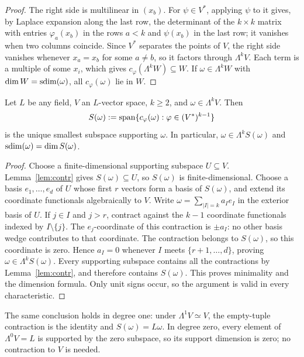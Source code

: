 \begin{proof}
The right side is multilinear in $(x_b)$. For $\psi\in V^*$, applying $\psi$ to it gives, by Laplace expansion along the
last row, the determinant of the $k\times k$ matrix with entries $\varphi_a(x_b)$ in the rows $a<k$ and $\psi(x_b)$ in the last
row; it vanishes when two columns coincide. Since $V^*$ separates the points of $V$, the right side
vanishes whenever $x_a=x_b$ for some $a\ne b$, so it factors through $\Lambda^kV$. Each term is a multiple of some $x_i$, which gives
$c_\varphi(\Lambda^kW)\subseteq W$. If $\omega\in\Lambda^kW$ with $\dim W=\operatorname{sdim}(\omega)$, all $c_\varphi(\omega)$ lie in $W$.
\end{proof}

\begin{proposition}\label{prop:canonical-support}
Let $L$ be any field, $V$ an $L$\nobreakdash-vector space, $k\ge2$, and
$\omega\in\Lambda^kV$. Then
\[
S(\omega):=\operatorname{span}\{c_\varphi(\omega):\varphi\in(V^*)^{k-1}\}
\]
is the unique smallest subspace supporting $\omega$. In particular,
$\omega\in\Lambda^k S(\omega)$ and
$\operatorname{sdim}(\omega)=\dim S(\omega)$.
\end{proposition}

\begin{proof}
Choose a finite-dimensional supporting subspace $U\subseteq V$.
Lemma~\ref{lem:contr} gives $S(\omega)\subseteq U$, so $S(\omega)$ is
finite-dimensional. Choose a basis $e_1,\dots,e_d$ of $U$ whose first
$r$ vectors form a basis of $S(\omega)$, and extend its coordinate
functionals algebraically to $V$. Write
$\omega=\sum_{|I|=k}a_Ie_I$ in the exterior basis of $U$.
If $j\in I$ and $j>r$, contract against the $k-1$ coordinate functionals
indexed by $I\setminus\{j\}$. The $e_j$\nobreakdash-coordinate of this
contraction is $\pm a_I$: no other basis wedge contributes to that
coordinate. The contraction belongs to $S(\omega)$, so this coordinate
is zero. Hence $a_I=0$ whenever $I$ meets $\{r+1,\dots,d\}$, proving
$\omega\in\Lambda^k S(\omega)$.
Every supporting subspace contains all the contractions by
Lemma~\ref{lem:contr}, and therefore contains $S(\omega)$. This proves
minimality and the dimension formula. Only unit signs occur, so the
argument is valid in every characteristic.
\end{proof}

The same conclusion holds in degree one: under $\Lambda^1V\simeq V$,
the empty-tuple contraction is the identity and $S(\omega)=L\omega$.
In degree zero, every element of $\Lambda^0V=L$ is supported by the
zero subspace, so its support dimension is zero; no contraction to
$V$ is needed.

